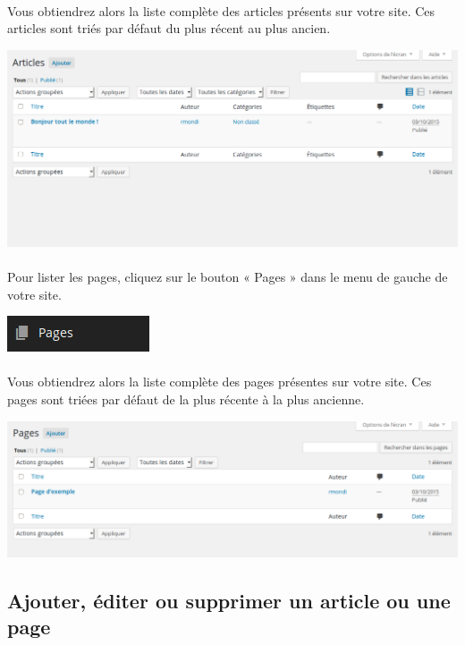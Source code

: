 \documentclass[10pt,a4paper]{article}
\begin{document}
\paragraph{}Vous obtiendrez alors la liste complète des articles présents sur votre site. Ces articles sont triés par défaut du plus récent au plus ancien.
\begin{center}
\includegraphics[scale=0.3]{img/0060.png}
\end{center}
\paragraph{}Pour lister les pages, cliquez sur le bouton « Pages » dans le menu de gauche de votre site.
\begin{center}
\includegraphics[scale=0.5]{img/0061.png}
\end{center}
\paragraph{}Vous obtiendrez alors la liste complète des pages présentes sur votre site. Ces pages sont triées par défaut de la plus récente à la plus ancienne.
\begin{center}
\includegraphics[scale=0.3]{img/0062.png}
\end{center}
\subsection{Ajouter, éditer ou supprimer un article ou une page}
\end{document}
